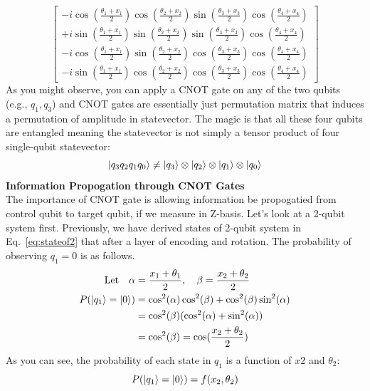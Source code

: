 \documentclass[12pt]{article}
\numberwithin{equation}{section}  %
\theoremstyle{definition}
\theoremstyle{plain}
\theoremstyle{remark}
\begin{document}
\begin{equation}
\begin{bmatrix}
-i\cos\left(\frac{\theta_1+x_1}{2}\right)
\cos\left(\frac{\theta_2+x_2}{2}\right)
\sin\left(\frac{\theta_3+x_3}{2}\right)
\cos\left(\frac{\theta_4+x_4}{2}\right)
\\[6pt]
+i\sin\left(\frac{\theta_1+x_1}{2}\right)
\sin\left(\frac{\theta_2+x_2}{2}\right)
\sin\left(\frac{\theta_3+x_3}{2}\right)
\cos\left(\frac{\theta_4+x_4}{2}\right)
\\[6pt]
-i\cos\left(\frac{\theta_1+x_1}{2}\right)
\sin\left(\frac{\theta_2+x_2}{2}\right)
\cos\left(\frac{\theta_3+x_3}{2}\right)
\cos\left(\frac{\theta_4+x_4}{2}\right)
\\[6pt]
-i\sin\left(\frac{\theta_1+x_1}{2}\right)
\cos\left(\frac{\theta_2+x_2}{2}\right)
\cos\left(\frac{\theta_3+x_3}{2}\right)
\cos\left(\frac{\theta_4+x_4}{2}\right)
\end{bmatrix}
\label{4state_3}
\end{equation}
As you might observe, you can apply a CNOT gate on any of the two qubits (e.g., $q_1,q_3$) and CNOT gates are essentially just permutation matrix that induces a permutation of amplitude in statevector. The magic is that all these four qubits are entangled meaning the statevector is not simply a tensor product of four single-qubit statevector:
\begin{equation*}
    \ket{q_3q_2q_1q_0}\neq\ket{q_3}\otimes\ket{q_2}\otimes\ket{q_1}\otimes\ket{q_0}
\end{equation*}
\textbf{Information Propogation through CNOT Gates}\\
The importance of CNOT gate is allowing information be propogatied from control qubit to target qubit, if we measure in Z-basis. Let's look at a 2-qubit system first. Previously, we have derived states of 2-qubit system in Eq.~\ref{eq:stateof2} that after a layer of encoding and rotation. The probability of observing $q_1=0$ is as follows. 
\begin{equation}
\begin{aligned}
\text{Let}\quad \alpha&=\frac{x_1+\theta_1}{2},\quad \beta=\frac{x_2+\theta_2}{2}\\
P(\ket{q_1}=\ket{0})&=\cos^2(\alpha)\cos^2(\beta)+\cos^2(\beta)\sin^2(\alpha)\\
&=\cos^2(\beta)(\cos^2(\alpha)+\sin^2(\alpha))\\
&=\cos^2(\beta)=\cos(\frac{x_2+\theta_2}{2})
\end{aligned}
\end{equation}
As you can see, the probability of each state in $q_1$ is a function of $x2$ and $\theta_2$:
\begin{equation*}
    P(\ket{q_1}=\ket{0})=f(x_2,\theta_2)
\end{equation*}
\end{document}
